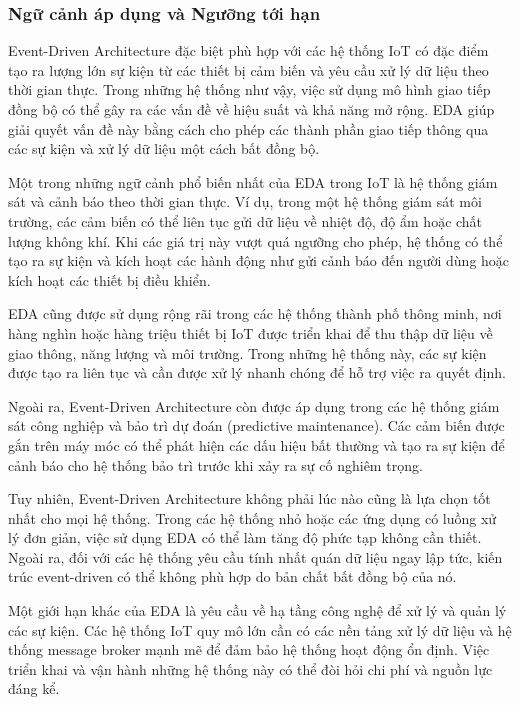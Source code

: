 \subsubsection{Ngữ cảnh áp dụng và Ngưỡng tới hạn}
Event-Driven Architecture đặc biệt phù hợp với các hệ thống IoT có đặc điểm tạo ra lượng lớn sự kiện từ các thiết bị cảm biến và yêu cầu xử lý dữ liệu theo thời gian thực. Trong những hệ thống như vậy, việc sử dụng mô hình giao tiếp đồng bộ có thể gây ra các vấn đề về hiệu suất và khả năng mở rộng. EDA giúp giải quyết vấn đề này bằng cách cho phép các thành phần giao tiếp thông qua các sự kiện và xử lý dữ liệu một cách bất đồng bộ.

Một trong những ngữ cảnh phổ biến nhất của EDA trong IoT là hệ thống giám sát và cảnh báo theo thời gian thực. Ví dụ, trong một hệ thống giám sát môi trường, các cảm biến có thể liên tục gửi dữ liệu về nhiệt độ, độ ẩm hoặc chất lượng không khí. Khi các giá trị này vượt quá ngưỡng cho phép, hệ thống có thể tạo ra sự kiện và kích hoạt các hành động như gửi cảnh báo đến người dùng hoặc kích hoạt các thiết bị điều khiển.

EDA cũng được sử dụng rộng rãi trong các hệ thống thành phố thông minh, nơi hàng nghìn hoặc hàng triệu thiết bị IoT được triển khai để thu thập dữ liệu về giao thông, năng lượng và môi trường. Trong những hệ thống này, các sự kiện được tạo ra liên tục và cần được xử lý nhanh chóng để hỗ trợ việc ra quyết định.

Ngoài ra, Event-Driven Architecture còn được áp dụng trong các hệ thống giám sát công nghiệp và bảo trì dự đoán (predictive maintenance). Các cảm biến được gắn trên máy móc có thể phát hiện các dấu hiệu bất thường và tạo ra sự kiện để cảnh báo cho hệ thống bảo trì trước khi xảy ra sự cố nghiêm trọng.

Tuy nhiên, Event-Driven Architecture không phải lúc nào cũng là lựa chọn tốt nhất cho mọi hệ thống. Trong các hệ thống nhỏ hoặc các ứng dụng có luồng xử lý đơn giản, việc sử dụng EDA có thể làm tăng độ phức tạp không cần thiết. Ngoài ra, đối với các hệ thống yêu cầu tính nhất quán dữ liệu ngay lập tức, kiến trúc event-driven có thể không phù hợp do bản chất bất đồng bộ của nó.

Một giới hạn khác của EDA là yêu cầu về hạ tầng công nghệ để xử lý và quản lý các sự kiện. Các hệ thống IoT quy mô lớn cần có các nền tảng xử lý dữ liệu và hệ thống message broker mạnh mẽ để đảm bảo hệ thống hoạt động ổn định. Việc triển khai và vận hành những hệ thống này có thể đòi hỏi chi phí và nguồn lực đáng kể.


